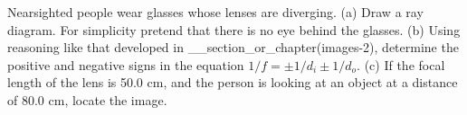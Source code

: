 \answercheck Nearsighted people wear glasses whose lenses are
diverging. (a) Draw a ray diagram. For simplicity pretend
that there is no eye behind the glasses. (b) Using reasoning
like that developed in __section_or_chapter(images-2), determine the
positive and negative signs in the equation $1/f=\pm1/d_i\pm1/d_o$. (c) If the
focal length of the lens is 50.0 cm, and the person is
looking at an object at a distance of 80.0 cm, locate the image.
